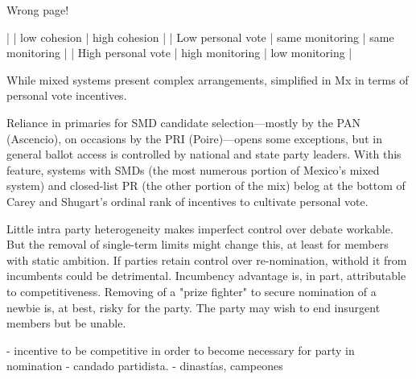 Wrong page!

|                    | low cohesion    | high cohesion   |
| Low personal vote  | same monitoring | same monitoring |
| High personal vote | high monitoring | low monitoring  |


While mixed systems present complex arrangements, simplified in Mx in terms of personal vote incentives. 

Reliance in primaries for SMD candidate selection---mostly by the PAN (Ascencio), on occasions by the PRI (Poire)---opens some exceptions, but in general ballot access is controlled by national and state party leaders. With this feature, systems with SMDs (the most numerous portion of Mexico's mixed system) and closed-list PR (the other portion of the mix) belog at the bottom of Carey and Shugart's \citeyearpar{carey.shugart.1995} ordinal rank of incentives to cultivate personal vote. 

Little intra party heterogeneity makes imperfect control over debate workable. 
But the removal of single-term limits might change this, at least for members with static ambition. If parties retain control over re-nomination, withold it from incumbents could be detrimental. Incumbency advantage is, in part, attributable to competitiveness. Removing of a "prize fighter" \citep{zallerprizeFighters} to secure nomination of a newbie is, at best, risky for the party. The party may wish to end insurgent members but be unable. 

- incentive to be competitive in order to become necessary for party in nomination
- candado partidista.
- dinastías, campeones




